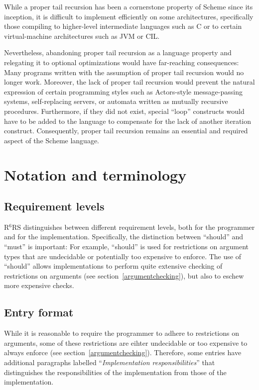 \documentclass[twoside,twocolumn]{algol60}
\newcommand{\rn}[1]{R$^{#1}$RS}
\begin{document}
While a proper tail recursion has been a cornerstone property of
Scheme since its inception, it is difficult to implement efficiently
on some architectures, specifically those compiling to higher-level
intermediate languages such as C or to certain virtual-machine
architectures such as JVM or CIL.

Nevertheless, abandoning proper tail recursion as a language property
and relegating it to optional optimizations would have far-reaching
consequences: Many programs written with the assumption of proper tail
recursion would no longer work.  Moreover, the lack of proper tail
recursion would prevent the natural expression of certain programming
styles such as Actors-style message-passing systems, self-replacing
servers, or automata written as mutually recursive procedures.
Furthermore, if they did not exist, special ``loop'' constructs would
have to be added to the language to compensate for the lack of another
iteration construct.  Consequently, proper tail recursion remains an
essential and required aspect of the Scheme language.

\chapter{Notation and terminology}

\section{Requirement levels}

\rn{6} distinguishes between different requirement levels, both for
the programmer and for the implementation.  Specifically, the
distinction between ``should'' and ``must'' is important: For example,
``should'' is used for restrictions on argument types that are
undecidable or potentially too expensive to enforce.  The use of
``should'' allows implementations to perform quite extensive checking
of restrictions on arguments (see section~\ref{argumentchecking}), but
also to eschew more expensive checks.

\section{Entry format}

While it is reasonable to require the programmer to adhere to
restrictions on arguments, some of these restrictions are eihter
undecidable or too expensive to always enforce (see
section~\ref{argumentchecking}).  Therefore, some entries have
additional paragraphs labelled ``\textit{Implementation
  responsibilities}'' that distinguishes the responsibilities of the
implementation from those of the implementation.
\end{document}
